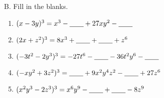 B. Fill in the blanks. 
\begin{enumerate}[label = \arabic*. ]
\item \hspce $(x - 3y)^{3} = x^{3} - \underline{\hspace{2em}}  + 27 x y^{2} - \underline{\hspace{2em}} $
\item \hspce $(2x + z^2)^{3} = 8 x^{3} + \underline{\hspace{2em}}  + \underline{\hspace{2em}}  + z^{6}$
\item \hspce $(-3t^2 - 2y^3)^{3} = - 27 t^{6} - \underline{\hspace{2em}}  - 36 t^{2} y^{6} - \underline{\hspace{2em}}  $
\item \hspce $(-xy^2 + 3z^2 )^{3} = \underline{\hspace{2em}}  + 9 x^{2} y^{4} z^{2} - \underline{\hspace{2em}}  + 27 z^{6}$
\item \hspce $(x^2y^3 - 2z^3)^{3} = x^{6} y^{9} - \underline{\hspace{2em}}  + \underline{\hspace{2em}}  - 8 z^{9}$
\end{enumerate}  